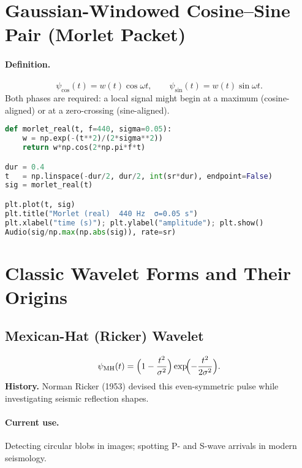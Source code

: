 \documentclass[11pt]{article}
\begin{document}
\section{Gaussian-Windowed Cosine–Sine Pair (Morlet Packet)}

\paragraph{Definition.}
\[
\psi_{\cos}(t)=w(t)\cos\omega t,\qquad
\psi_{\sin}(t)=w(t)\sin\omega t.
\]
Both phases are required: a local signal might begin at a maximum
(cosine-aligned) or at a zero-crossing (sine-aligned).

\begin{lstlisting}[language=Python,caption={Plot \& play real part of a Morlet packet}]
def morlet_real(t, f=440, sigma=0.05):
    w = np.exp(-(t**2)/(2*sigma**2))
    return w*np.cos(2*np.pi*f*t)

dur = 0.4
t   = np.linspace(-dur/2, dur/2, int(sr*dur), endpoint=False)
sig = morlet_real(t)

plt.plot(t, sig)
plt.title("Morlet (real)  440 Hz  σ=0.05 s")
plt.xlabel("time (s)"); plt.ylabel("amplitude"); plt.show()
Audio(sig/np.max(np.abs(sig)), rate=sr)
\end{lstlisting}

\section{Classic Wavelet Forms and Their Origins}

\subsection{Mexican-Hat (Ricker) Wavelet}
\[
\psi_{\text{MH}}(t)=\Bigl(1-\frac{t^{2}}{\sigma^{2}}\Bigr)
                    \exp\!\Bigl(-\frac{t^{2}}{2\sigma^{2}}\Bigr).
\]
\textbf{History.}  Norman Ricker (1953) devised this even-symmetric pulse
while investigating seismic reflection shapes.

\paragraph{Current use.}  Detecting circular blobs in images; spotting
P- and S-wave arrivals in modern seismology.
\end{document}
